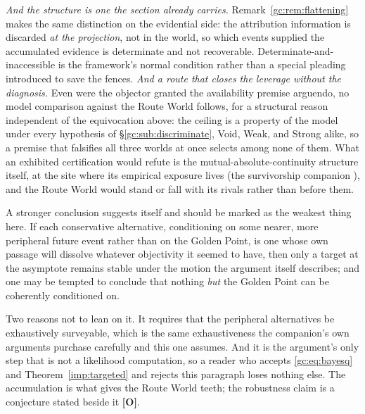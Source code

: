 \begin{remark}
\emph{And the structure is one the section already carries.}
Remark~\ref{gc:rem:flattening} makes the same distinction on the
evidential side: the attribution information is discarded \emph{at the
projection}, not in the world, so which events supplied the accumulated
evidence is determinate and not recoverable. Determinate-and-inaccessible
is the framework's normal condition rather than a special pleading
introduced to save the fences. \emph{And a route that closes the leverage without the diagnosis.}
Even were the objector granted the availability premise arguendo, no
model comparison against the Route World follows, for a structural reason
independent of the equivocation above: the ceiling is a property of the
model under every hypothesis of \S\ref{gc:sub:discriminate}, Void,
Weak, and Strong alike, so a premise that falsifies all three worlds
at once selects among none of them. What an exhibited certification
would refute is the mutual-absolute-continuity structure itself, at the
site where its empirical exposure lives (the survivorship companion \cite{GoldenSurvivorship}), and
the Route World would stand or fall with its rivals rather than before
them.
\end{remark}

\begin{remark}
\label{gc:rem:routerobust}
A stronger conclusion suggests itself and should be marked as the
weakest thing here. If each conservative alternative, conditioning on
some nearer, more peripheral future event rather than on the Golden
Point, is one whose own passage will dissolve whatever objectivity it
seemed to have, then only a target at the asymptote remains stable under
the motion the argument itself describes; and one may be tempted to
conclude that nothing \emph{but} the Golden Point can be coherently
conditioned on.

Two reasons not to lean on it. It requires that the peripheral
alternatives be exhaustively surveyable, which is the same
exhaustiveness the companion's own arguments purchase carefully and this
one assumes. And it is the argument's only step that is not a
likelihood computation, so a reader who accepts \eqref{gc:eq:bayesq} and
Theorem~\ref{imp:targeted} and rejects this paragraph loses nothing else.
The accumulation is what gives the Route World teeth; the robustness
claim is a conjecture stated beside it \textbf{[O]}.
\end{remark}

